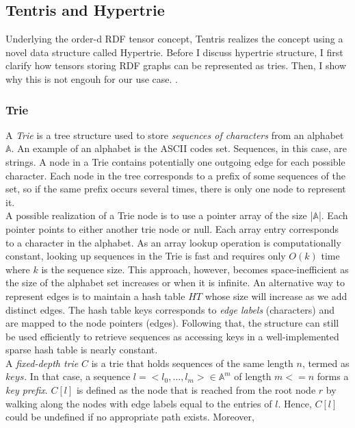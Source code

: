 \clearpage

\subsection{Tentris and Hypertrie}
\label{sec:hypertrie}
Underlying the order-d RDF tensor concept, Tentris realizes the concept using a novel data structure called Hypertrie. Before I discuss hypertrie structure, I first clarify how tensors storing RDF graphs can be represented as tries. Then, I show why this is not engouh for our use case. .

\subsubsection{Trie}
A \textit{Trie} is a tree structure used to store \textit{sequences of characters} from an alphabet $\mathbb{A}$. An example of an alphabet is the ASCII codes set. Sequences, in this case, are strings. A node in a Trie contains potentially one outgoing edge for each possible character. Each node in the tree corresponds to a prefix of some sequences of the set, so if the same prefix occurs several times, there is only one node to represent it.\\

A possible realization of a Trie node is to use a pointer array of the size |$\mathbb{A}$|. Each pointer points to either another trie node or null. Each array entry corresponds to a character in the alphabet. As an array lookup operation is computationally constant, looking up sequences in the Trie is fast and requires only $O(k)$ time where $k$ is the sequence size. This approach, however, becomes space-inefficient as the size of the alphabet set increases or when it is infinite. An alternative way to represent edges is to maintain a hash table $HT$ whose size will increase as we add distinct edges. The hash table keys corresponds to \textit{edge labels} (characters) and are mapped to the node pointers (edges). Following that, the structure can still be used efficiently to retrieve sequences as accessing keys in a well-implemented sparse hash table is nearly constant. \\ 

A \textit{fixed-depth trie} $C$ is a trie that holds sequences of the same length $n$, termed as $keys$. In that case, a sequence $l = <l_0, … , l_m> \in \mathbb{A}^m$ of length $m <= n$ forms a \textit{key prefix}. $C[l]$ is defined as the node that is reached from the root node $r$ by walking along the nodes with edge labels equal to the entries of $l$. Hence, $C[l]$ could be undefined if no appropriate path exists. Moreover, \\

